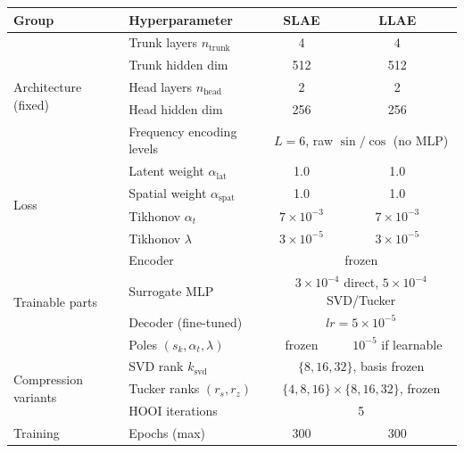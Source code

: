 ﻿\documentclass[a4paper,12pt]{article}
\theoremstyle{definition}
\theoremstyle{remark}
\begin{document}
\begin{table}[htbp]
    \centering
    \footnotesize
    \setlength{\tabcolsep}{4pt}
    \renewcommand{\arraystretch}{1.2}
    \begin{tabular}{llcc}
        \toprule
        \textbf{Group} & \textbf{Hyperparameter} & \textbf{SLAE} & \textbf{LLAE} \\
        \midrule
        \multirow{5}{*}{Architecture (fixed)}
          & Trunk layers $n_\text{trunk}$   & 4 & 4 \\
          & Trunk hidden dim                & 512 & 512 \\
          & Head layers $n_\text{head}$     & 2 & 2 \\
          & Head hidden dim                 & 256 & 256 \\
          & Frequency encoding levels       & \multicolumn{2}{c}{$L = 6$, raw $\sin/\cos$ (no MLP)} \\
        \midrule
        \multirow{4}{*}{Loss}
          & Latent weight $\alpha_\text{lat}$   & 1.0 & 1.0 \\
          & Spatial weight $\alpha_\text{spat}$ & 1.0 & 1.0 \\
          & Tikhonov $\alpha_t$                 & $7\times10^{-3}$ & $7\times10^{-3}$ \\
          & Tikhonov $\lambda$                  & $3\times10^{-5}$ & $3\times10^{-5}$ \\
        \midrule
        \multirow{4}{*}{Trainable parts}
          & Encoder                         & \multicolumn{2}{c}{frozen} \\
          & Surrogate MLP                   & \multicolumn{2}{c}{$3\times10^{-4}$ direct, $5\times10^{-4}$ SVD/Tucker} \\
          & Decoder (fine-tuned)            & \multicolumn{2}{c}{$lr = 5\times10^{-5}$} \\
          & Poles $(s_k, \alpha_t, \lambda)$ & frozen & $10^{-5}$ if learnable \\
        \midrule
        \multirow{3}{*}{Compression variants}
          & SVD rank $k_\text{svd}$         & \multicolumn{2}{c}{$\{8, 16, 32\}$, basis frozen} \\
          & Tucker ranks $(r_s, r_z)$       & \multicolumn{2}{c}{$\{4,8,16\}\times\{8,16,32\}$, frozen} \\
          & HOOI iterations                 & \multicolumn{2}{c}{5} \\
        \midrule
        \multirow{5}{*}{Training}
          & Epochs (max)                    & 300 & 300 \\

\end{tabular}
\end{table}
\end{document}
